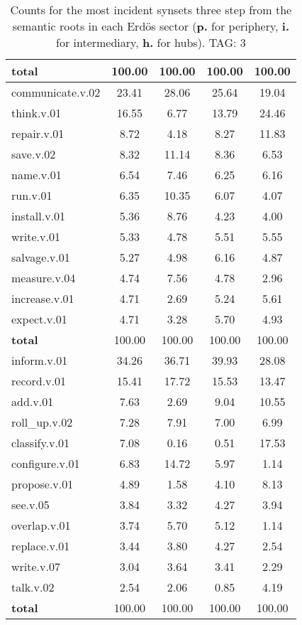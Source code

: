 \begin{table}[h!]
\begin{center}
\begin{tabular}{| l || c | c | c | c |}
{{\bf total}} & 100.00  & 100.00  & 100.00  & 100.00 \\\hline\hline\hline
communicate.v.02 & 23.41  & 28.06  & 25.64  & 19.04 \\\hline
think.v.01 & 16.55  & 6.77  & 13.79  & 24.46 \\\hline
repair.v.01 & 8.72  & 4.18  & 8.27  & 11.83 \\\hline
save.v.02 & 8.32  & 11.14  & 8.36  & 6.53 \\\hline
name.v.01 & 6.54  & 7.46  & 6.25  & 6.16 \\\hline
run.v.01 & 6.35  & 10.35  & 6.07  & 4.07 \\\hline
install.v.01 & 5.36  & 8.76  & 4.23  & 4.00 \\\hline
write.v.01 & 5.33  & 4.78  & 5.51  & 5.55 \\\hline
salvage.v.01 & 5.27  & 4.98  & 6.16  & 4.87 \\\hline
measure.v.04 & 4.74  & 7.56  & 4.78  & 2.96 \\\hline
increase.v.01 & 4.71  & 2.69  & 5.24  & 5.61 \\\hline
expect.v.01 & 4.71  & 3.28  & 5.70  & 4.93 \\\hline\hline
{{\bf total}} & 100.00  & 100.00  & 100.00  & 100.00 \\\hline\hline\hline
inform.v.01 & 34.26  & 36.71  & 39.93  & 28.08 \\\hline
record.v.01 & 15.41  & 17.72  & 15.53  & 13.47 \\\hline
add.v.01 & 7.63  & 2.69  & 9.04  & 10.55 \\\hline
roll\_up.v.02 & 7.28  & 7.91  & 7.00  & 6.99 \\\hline
classify.v.01 & 7.08  & 0.16  & 0.51  & 17.53 \\\hline
configure.v.01 & 6.83  & 14.72  & 5.97  & 1.14 \\\hline
propose.v.01 & 4.89  & 1.58  & 4.10  & 8.13 \\\hline
see.v.05 & 3.84  & 3.32  & 4.27  & 3.94 \\\hline
overlap.v.01 & 3.74  & 5.70  & 5.12  & 1.14 \\\hline
replace.v.01 & 3.44  & 3.80  & 4.27  & 2.54 \\\hline
write.v.07 & 3.04  & 3.64  & 3.41  & 2.29 \\\hline
talk.v.02 & 2.54  & 2.06  & 0.85  & 4.19 \\\hline\hline
{{\bf total}} & 100.00  & 100.00  & 100.00  & 100.00 \\\hline
\end{tabular}
\caption{Counts for the most incident synsets three step from the semantic roots in each Erd\"os sector ({\bf p.} for periphery, {\bf i.} for intermediary, {\bf h.} for hubs). TAG: 3}
\end{center}
\end{table}